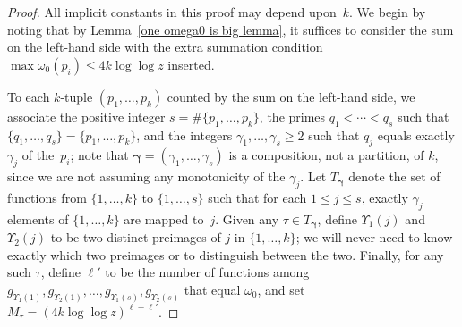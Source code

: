 \documentclass[12pt,reqno]{amsart}
\theoremstyle{definition}
\newcommand{\bgamma}{{\bm\gamma}}
\begin{document}
\begin{proof}
All implicit constants in this proof may depend upon~$k$. We begin by noting that by Lemma~\ref{one omega0 is big lemma}, it suffices to consider the sum on the left-hand side with the extra summation condition $\max \omega_0(p_i) \leq 4k\log\log z$ inserted.

To each $k$-tuple $(p_1,\dots,p_k)$ counted by the sum on the left-hand side, we associate the positive integer $s = \#\{p_1,\dots,p_k\}$, the primes $q_1<\cdots<q_s$ such that $\{q_1,\dots,q_s\} = \{p_1,\dots,p_k\}$, and the integers $\gamma_1,\dots,\gamma_s\ge2$ such that $q_j$ equals exactly $\gamma_j$ of the~$p_i$; note that $\bgamma = (\gamma_1,\dots,\gamma_s)$ is a composition, not a partition, of $k$, since we are not assuming any monotonicity of the $\gamma_j$. Let $T_\bgamma$ denote the set of functions from $\{1,\dots,k\}$ to $\{1,\dots,s\}$ such that for each $1\le j\le s$, exactly $\gamma_j$ elements of $\{1,\dots,k\}$ are mapped to~$j$. Given any $\tau\in T_\bgamma$, define $\Upsilon_1(j)$ and $\Upsilon_2(j)$ to be two distinct preimages of $j$ in $\{1,\dots,k\}$; we will never need to know exactly which two preimages or to distinguish between the two. Finally, for any such $\tau$, define $\ell'$ to be the number of functions among $g_{\Upsilon_1(1)},g_{\Upsilon_2(1)},\dots,g_{\Upsilon_1(s)},g_{\Upsilon_2(s)}$ that equal $\omega_0$, and set $M_\tau = (4k\log\log z)^{\ell-\ell'}$.


\end{proof}
\end{document}

